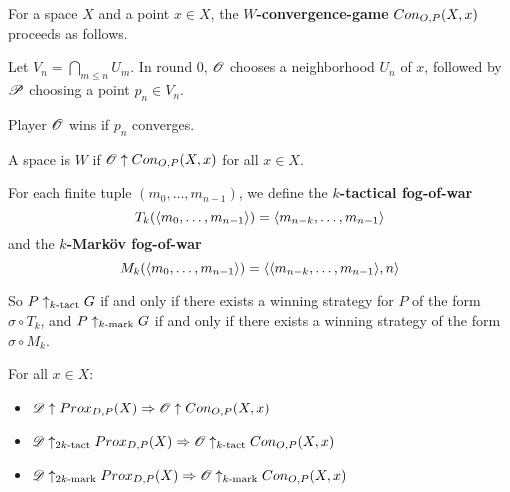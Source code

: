 \begin{definition}
  For a space $X$ and a point $x\in X$, the \textbf{$W$-convergence-game} $Con_{O,P}(X,x)$ proceeds as follows. 

  Let $V_n=\bigcap_{m\leq n} U_m$. In round $0$, $\mathscr{O}$ chooses a neighborhood $U_n$ of $x$, followed by $\mathscr{P}$ choosing a point $p_n\in V_n$.

  Player $\mathscr{O}$ wins if $p_n$ converges.
\end{definition}

\begin{definition}
  A space is \textbf{$W$} if $\mathscr{O} \uparrow Con_{O,P}(X,x)$ for all $x\in X$.
\end{definition}

\begin{definition}
  For each finite tuple $(m_0,\dots,m_{n-1})$, we define the \textbf{$k$-tactical fog-of-war}
    \[
      T_k(\langle m_0,\dots,m_{n-1}\rangle)=\langle m_{n-k},\dots,m_{n-1}\rangle
    \]
  and the \textbf{$k$-Mark\"ov fog-of-war}
    \[
      M_k(\langle m_0,\dots,m_{n-1}\rangle)=\langle\langle m_{n-k},\dots,m_{n-1}\rangle,n\rangle
    \]

  So $P\uparrow_{k\text{-tact}}G$ if and only if there exists a winning strategy for $P$ of the form $\sigma\circ T_k$, and $P\uparrow_{k\text{-mark}}G$ if and only if there exists a winning strategy of the form $\sigma\circ M_k$.
\end{definition}

\begin{theorem}
For all $x\in X$:
  \begin{itemize}
    \item
      $\mathscr{D}\uparrow Prox_{D,P}(X) \Rightarrow \mathscr{O} \uparrow Con_{O,P}(X,x)$
    \item
      $\mathscr{D}\uparrow_{2k\text{-tact}} Prox_{D,P}(X) \Rightarrow \mathscr{O} \uparrow_{k\text{-tact}} Con_{O,P}(X,x)$
    \item
      $\mathscr{D}\uparrow_{2k\text{-mark}} Prox_{D,P}(X) \Rightarrow \mathscr{O} \uparrow_{k\text{-mark}} Con_{O,P}(X,x)$
  \end{itemize}
\end{theorem}

